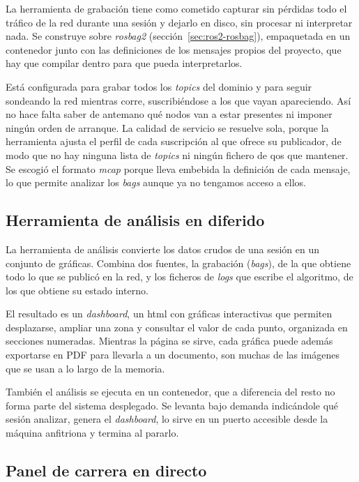 La herramienta de grabación tiene como cometido capturar sin pérdidas todo el tráfico de la red durante una sesión y dejarlo en disco, sin procesar ni interpretar nada. Se construye sobre \emph{rosbag2} (sección~\ref{sec:ros2-rosbag}), empaquetada en un contenedor junto con las definiciones de los mensajes propios del proyecto, que hay que compilar dentro para que pueda interpretarlos.

Está configurada para grabar todos los \emph{topics} del dominio y para seguir sondeando la red mientras corre, suscribiéndose a los que vayan apareciendo. Así no hace falta saber de antemano qué nodos van a estar presentes ni imponer ningún orden de arranque. La calidad de servicio se resuelve sola, porque la herramienta ajusta el perfil de cada suscripción al que ofrece su publicador, de modo que no hay ninguna lista de \emph{topics} ni ningún fichero de \gls{qos} que mantener. 
Se escogió el formato \emph{mcap} porque lleva embebida la definición de cada mensaje, lo que permite analizar los \emph{bags} aunque ya no tengamos acceso a ellos.

\subsection{Herramienta de análisis en diferido}
\label{subsec:visualizacion-analisis}

La herramienta de análisis convierte los datos crudos de una sesión en un conjunto de gráficas. Combina dos fuentes, la grabación (\emph{bags}), de la que obtiene todo lo que se publicó en la red, y los ficheros de \emph{logs} que escribe el algoritmo, de los que obtiene su estado interno.

El resultado es un \emph{dashboard}, un html con gráficas interactivas que permiten desplazarse, ampliar una zona y consultar el valor de cada punto, organizada en secciones numeradas. Mientras la página se sirve, cada gráfica puede además exportarse en PDF para llevarla a un documento, son muchas de las imágenes que se usan a lo largo de la memoria.

También el análisis se ejecuta en un contenedor, que a diferencia del resto no forma parte del sistema desplegado. Se levanta bajo demanda indicándole qué sesión analizar, genera el \emph{dashboard}, lo sirve en un puerto accesible desde la máquina anfitriona y termina al pararlo.

\subsection{Panel de carrera en directo}
\label{subsec:visualizacion-directo}

